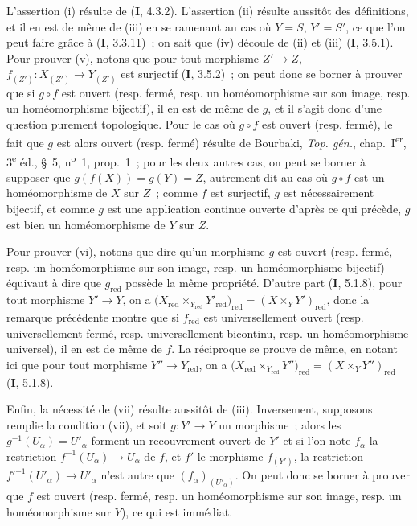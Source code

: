 L'assertion (i) résulte de (\textbf{I}, 4.3.2). L'assertion (ii) résulte aussitôt des
définitions, et il en est de même de (iii) en se ramenant au cas où $Y=S$,
$Y'=S'$, ce que l'on peut faire grâce à (\textbf{I}, 3.3.11)~; on sait que (iv)
découle de (ii) et (iii) (\textbf{I}, 3.5.1). Pour prouver (v), notons que pour tout
morphisme $Z'\to Z$, $f_{(Z')}:X_{(Z')}\to Y_{(Z')}$ est surjectif
(\textbf{I}, 3.5.2)~; on peut donc se borner à prouver que si $g\circ f$ est ouvert
(resp. fermé, resp. un
homéomorphisme sur son image, resp. un homéomorphisme bijectif), il en est de
même de $g$, et il s'agit donc d'une question purement topologique. Pour le
cas où $g\circ f$ est ouvert (resp. fermé), le fait que $g$ est alors ouvert
(resp. fermé) résulte de Bourbaki, \emph{Top. gén.}, chap.~I\textsuperscript{er},
3\textsuperscript{e} éd., \S~5, n\textsuperscript{o}~1, prop.~1~; pour les
deux autres cas, on peut se borner à supposer que
$g(f(X))=g(Y)=Z$, autrement dit au cas où $g\circ f$ est un homéomorphisme de
$X$ sur $Z$~; comme $f$ est surjectif, $g$ est nécessairement bijectif, et
comme $g$ est une application continue ouverte d'après ce qui précède, $g$
est bien un homéomorphisme de $Y$ sur $Z$.

Pour prouver (vi), notons que dire qu'un morphisme $g$ est ouvert (resp.
fermé, resp. un homéomorphisme sur son image, resp. un homéomorphisme
bijectif) équivaut à dire que $g_{\mathrm{red}}$ possède la même propriété.
D'autre part (\textbf{I}, 5.1.8), pour tout morphisme $Y'\to Y$, on a
$\bigl(X_{\mathrm{red}}\times_{Y_{\mathrm{red}}}Y'_{\mathrm{red}}\bigr)_{\mathrm{red}}
=(X\times_Y Y')_{\mathrm{red}}$,
donc la remarque précédente montre que si $f_{\mathrm{red}}$ est
universellement ouvert (resp. universellement fermé, resp. universellement
bicontinu, resp. un homéomorphisme universel), il en est de même de $f$. La
réciproque se prouve de même, en notant ici que pour tout morphisme
$Y''\to Y_{\mathrm{red}}$, on a
$\bigl(X_{\mathrm{red}}\times_{Y_{\mathrm{red}}}Y''\bigr)_{\mathrm{red}}
=(X\times_Y Y'')_{\mathrm{red}}$
(\textbf{I}, 5.1.8).

Enfin, la nécessité de (vii) résulte aussitôt de (iii). Inversement, supposons
remplie la condition (vii), et soit $g:Y'\to Y$ un morphisme~; alors les
$g^{-1}(U_\alpha)=U'_\alpha$ forment un recouvrement ouvert de $Y'$ et si
l'on note $f_\alpha$ la restriction $f^{-1}(U_\alpha)\to U_\alpha$ de $f$,
et $f'$ le morphisme $f_{(Y')}$, la restriction
$f'^{-1}(U'_\alpha)\to U'_\alpha$ n'est autre que
$(f_\alpha)_{(U'_\alpha)}$. On peut donc se borner à prouver que $f$ est
ouvert (resp. fermé, resp. un homéomorphisme sur son image, resp. un
homéomorphisme sur $Y$), ce qui est immédiat.

